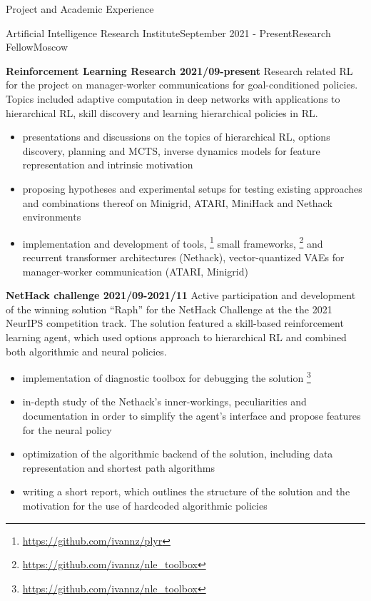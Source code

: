 \documentclass{resume} %
\begin{document}
\begin{rSection}{Project and Academic Experience}

\begin{rSubsection}{Artificial Intelligence Research Institute}{September 2021 - Present}{Research Fellow}{Moscow}
    \item \textbf{Reinforcement Learning Research 2021/09-present}
    Research related RL for the project on manager-worker communications for goal-conditioned
    policies. Topics included adaptive computation in deep networks with applications to
    hierarchical RL, skill discovery and learning hierarchical policies in RL.
    \begin{itemize}
        \item presentations and discussions on the topics of hierarchical RL, options discovery,
        planning and MCTS, inverse dynamics models for feature representation and intrinsic motivation
        \item proposing hypotheses and experimental setups for testing existing approaches
        and combinations thereof on Minigrid, ATARI, MiniHack and Nethack environments
        \item implementation and development of tools,%
            \footnote{\url{https://github.com/ivannz/plyr}}
        small frameworks,%
            \footnote{\url{https://github.com/ivannz/nle_toolbox}}
        and recurrent transformer architectures (Nethack), vector-quantized VAEs for
        manager-worker communication (ATARI, Minigrid)
    \end{itemize}

    \item \textbf{NetHack challenge 2021/09-2021/11}
    Active participation and development of the winning solution ``Raph'' for the NetHack
    Challenge at the the 2021 NeurIPS competition track. The solution featured a skill-based
    reinforcement learning agent, which used options approach to hierarchical RL and combined
    both algorithmic and neural policies.
    \begin{itemize}
        \item implementation of diagnostic toolbox for debugging the solution%
            \footnote{\url{https://github.com/ivannz/nle_toolbox}}
        \item in-depth study of the Nethack's inner-workings, peculiarities and documentation
        in order to simplify the agent's interface and propose features for the neural policy
        \item optimization of the algorithmic backend of the solution, including data representation
        and shortest path algorithms
        \item writing a short report, which outlines the structure of the solution and
        the motivation for the use of hardcoded algorithmic policies
    \end{itemize}
\end{rSubsection}


\end{rSection}
\end{document}
